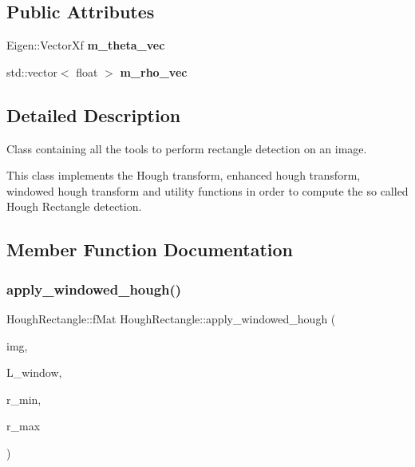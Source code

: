 \subsection*{Public Attributes}
\begin{DoxyCompactItemize}
\item 
\mbox{\label{class_hough_rectangle_a921574bcf35739fe8317458e3a899179}} 
Eigen\+::\+Vector\+Xf {\bfseries m\+\_\+theta\+\_\+vec}
\item 
\mbox{\label{class_hough_rectangle_a072a4eff485ec2848d7697934cabd189}} 
std\+::vector$<$ float $>$ {\bfseries m\+\_\+rho\+\_\+vec}
\end{DoxyCompactItemize}


\subsection{Detailed Description}
Class containing all the tools to perform rectangle detection on an image.

This class implements the Hough transform, enhanced hough transform, windowed hough transform and utility functions in order to compute the so called Hough Rectangle detection. 

\subsection{Member Function Documentation}
\mbox{\label{class_hough_rectangle_a5e4e337efcd49b7c0c77ee180847197f}} 
\subsubsection{\texorpdfstring{apply\+\_\+windowed\+\_\+hough()}{apply\_windowed\_hough()}}
{\footnotesize\ttfamily Hough\+Rectangle\+::f\+Mat Hough\+Rectangle\+::apply\+\_\+windowed\+\_\+hough (\begin{DoxyParamCaption}\item[{const f\+Mat \&}]{img,  }\item[{const int \&}]{L\+\_\+window,  }\item[{const int \&}]{r\+\_\+min,  }\item[{const int \&}]{r\+\_\+max }\end{DoxyParamCaption})}

